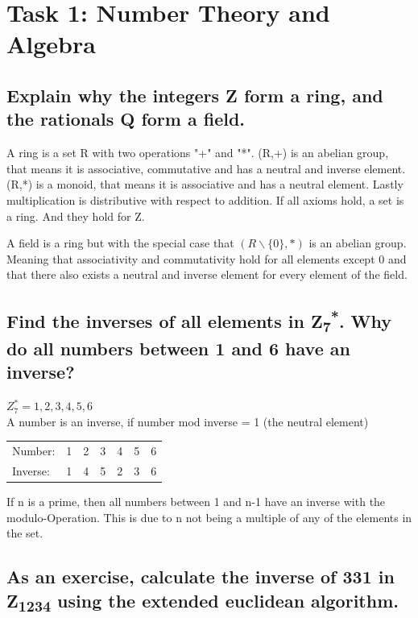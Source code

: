 \section{Task 1: Number Theory and Algebra}

\subsection{Explain why the integers Z form a ring, and the rationals Q form a field.}


A ring is a set R with two operations "+" and "*". (R,+) is an abelian group, that means it is associative, commutative and has a neutral and inverse element. (R,*) is a monoid, that means it is associative and has a neutral element. Lastly multiplication is distributive with respect to addition. If all axioms hold, a set is a ring. And they hold for Z.


A field is a ring but with the special case that $(R \backslash \{0\}, *)$ is an abelian group. Meaning that associativity and commutativity hold for all elements except 0 and that there also exists a neutral and inverse element for every element of the field.

\subsection{Find the inverses of all elements in Z\textsubscript{7}\textsuperscript{*}. Why do all numbers between 1 and 6 have an inverse?}

$Z^*_7 = {1,2,3,4,5,6}$\\
A number is an inverse, if number mod inverse = 1 (the neutral element)

\begin{tabular}{l c c c c c c}
	Number: & 1 & 2 & 3 & 4 & 5 & 6\\
	Inverse: & 1 & 4 & 5 & 2 & 3 & 6\\
\end{tabular}


If n is a prime, then all numbers between 1 and n-1 have an inverse with the modulo-Operation. This is due to n not being a multiple of any of the elements in the set.

\subsection{As an exercise, calculate the inverse of 331 in Z\textsubscript{1234} using the extended euclidean algorithm.}

